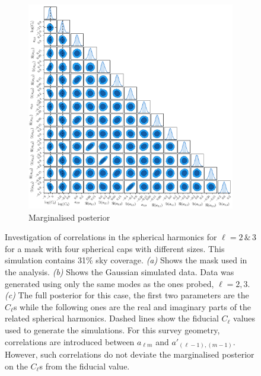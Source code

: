 \begin{figure}
\begin{subfigure}[b]{\textwidth}
 \includegraphics[width=\textwidth]{BPL-FIGS/Blob_fsky_01_trianglePlot.pdf}
  \caption{Marginalised posterior}
  \label{fig:BPL:BlobTriang}
\end{subfigure}
\caption[Investigation of correlation spherical harmonics for $\ell = 2\, \& \, 3$ for a mask with four spherical caps with different sizes containing a 10\% sky fraction]{Investigation of correlations in the spherical harmonics for $\ell = 2\, \& \, 3$ for a mask with four spherical caps with different sizes. This simulation contains 31\% sky coverage. \textit{(a)} Shows the mask used in the analysis. \textit{(b)} Shows the Gaussian simulated data. Data was generated using only the same modes as the ones probed, $\ell = 2,3$. \textit{(c)} The full posterior for this case, the first two parameters are the $C_{\ell}$s while the following ones are the real and imaginary parts of the related spherical harmonics. Dashed lines show the fiducial $C_{\ell}$ values used to generate the simulations. For this survey geometry, correlations are introduced between $a_{\ell m}$ and $a'_{(\ell-1),(m-1)}$. However, such correlations do not deviate the marginalised posterior on the $C_{\ell}$s from the fiducial value.}
\label{fig:BPL:Blob}
\end{figure}

